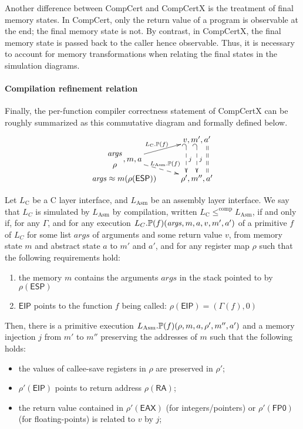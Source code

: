 Another difference between CompCert and CompCertX is the treatment of
final memory states. In CompCert, only the return value
of a program is observable at the end; the final memory state
is not. By contrast, in CompCertX, the final memory state
is passed back to the caller hence observable. Thus, it is
necessary to account for memory transformations when relating
the final states in the simulation diagrams.

\paragraph{Compilation refinement relation}
Finally, the per-function compiler correctness statement of CompCertX
can be roughly summarized as this commutative diagram and formally defined below.
\[
\xymatrix@R=3pt@C+=3pt{
& v, m', a'
\ar@<-3ex>@{_{(}-->}[dd]^j
\ar@{_{(}-->}[dd]^j
\ar@<3ex>@{==}[dd]
\\
\genfrac{}{}{0pt}{0}{\mathit{args}}{\rho}, m, a
\ar[ur]^{L_\text{C}.\primt(f)}
\ar@{-->}[dr]^{L_\text{Asm}.\primt(f)} \\
\mathit{args} \approx m(\rho(\textsf{ESP}))
& \rho', m'', a'
}
\]

\begin{definition}
Let $L_\text{C}$ be a C layer interface, and $L_{\text{Asm}}$ be an
assembly layer interface. We say that $L_C$ is simulated by
$L_{\text{Asm}}$ by compilation, written $L_{\text{C}}
\leqslant^{\textrm{comp}} L_{\text{Asm}}$, if and only if, for any $\Gamma$, and for any execution $L_C.\mathbb{P}(f)(\mathit{args}, m, a, v, m', a')$ of a primitive $f$ of $L_C$ for some list $\mathit{args}$ of arguments and some return value $v$, from  memory state $m$ and abstract state $a$ to $m'$ and $a'$, and for any register map $\rho$ such that the following requirements hold:
\begin{enumerate}
\item the memory $m$ contains the arguments $\mathit{args}$ in the stack pointed to by $\rho(\mathsf{ESP})$
\item $\mathsf{EIP}$ points to the function $f$ being called: $\rho(\mathsf{EIP}) = (\Gamma(f), 0)$
\end{enumerate}
Then, there is a primitive execution $L_{\text{Asm}}.\mathbb{P}(f)(\rho, m, a,
\rho', m'', a')$ and a memory injection $j$ from $m'$ to $m''$
preserving the addresses of $m$ such that the following holds:
\begin{itemize} %
\item the values of callee-save registers in $\rho$ are preserved in $\rho'$;
\item $\rho'(\mathsf{EIP})$ points to return address $\rho(\mathsf{RA})$;
\item the return value contained in $\rho'(\mathsf{EAX})$ (for integers/pointers) or $\rho'(\mathsf{FP0})$ (for floating-points) is related to $v$ by $j$;
\end{itemize}
\end{definition}

